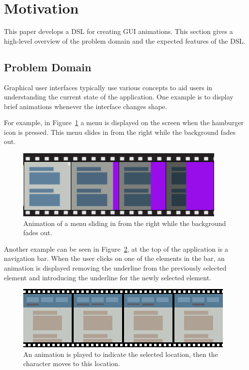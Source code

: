 \section{Motivation}
\label{sec:motivation}

This paper develops a DSL for creating GUI animations. This section gives a high-level overview of the problem domain and the expected features of the DSL.

\subsection{Problem Domain}

Graphical user interfaces typically use various concepts to aid users in understanding the current state of the application. One example is to display brief animations whenever the interface changes shape.

For example, in Figure~\ref{fig:usecase1} a menu is displayed on the screen when the hamburger icon is pressed. This menu slides in from the right while the background fades out.

\begin{figure}[H]
\centering
\includegraphics[scale=0.4]{pictures/usecase1fig.png}
\caption{Animation of a menu sliding in from the right while the background fades out.}
\label{fig:usecase1}
\end{figure}

Another example can be seen in Figure~\ref{fig:usecase2}, at the top of the application is a navigation bar. When the user clicks on one of the elements in the bar, an animation is displayed removing the underline from the previously selected element and introducing the underline for the newly selected element.

\begin{figure}[H]
\centering
\includegraphics[width=\figscale\textwidth]{pictures/usecase2fig}
\caption{An animation is played to indicate the selected location, then the character moves to this location.}
\label{fig:usecase2}
\end{figure}

